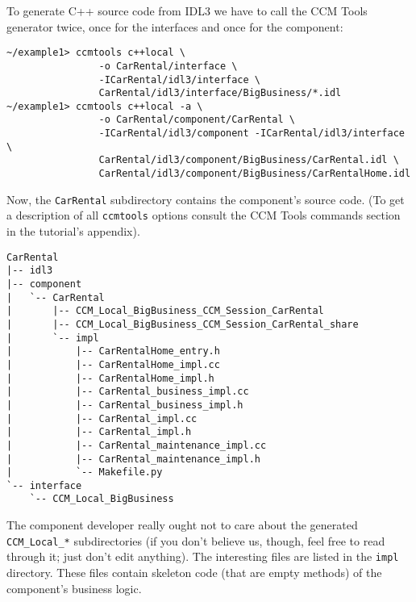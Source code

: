 \newpage
To generate C++ source code from IDL3 we have to call the CCM Tools generator
twice, once for the interfaces and once for the component:
\begin{small}
\begin{verbatim}
~/example1> ccmtools c++local \
                -o CarRental/interface \
                -ICarRental/idl3/interface \
                CarRental/idl3/interface/BigBusiness/*.idl
~/example1> ccmtools c++local -a \
                -o CarRental/component/CarRental \
                -ICarRental/idl3/component -ICarRental/idl3/interface \
                CarRental/idl3/component/BigBusiness/CarRental.idl \
                CarRental/idl3/component/BigBusiness/CarRentalHome.idl
\end{verbatim}
\end{small}

Now, the {\tt CarRental} subdirectory contains the component's source code. 
(To get a description of all {\tt ccmtools} options consult the 
CCM Tools commands section in the tutorial's appendix).
\begin{small}
\begin{verbatim}
CarRental
|-- idl3
|-- component
|   `-- CarRental
|       |-- CCM_Local_BigBusiness_CCM_Session_CarRental
|       |-- CCM_Local_BigBusiness_CCM_Session_CarRental_share
|       `-- impl
|           |-- CarRentalHome_entry.h
|           |-- CarRentalHome_impl.cc
|           |-- CarRentalHome_impl.h
|           |-- CarRental_business_impl.cc
|           |-- CarRental_business_impl.h
|           |-- CarRental_impl.cc
|           |-- CarRental_impl.h
|           |-- CarRental_maintenance_impl.cc
|           |-- CarRental_maintenance_impl.h
|           `-- Makefile.py
`-- interface
    `-- CCM_Local_BigBusiness
\end{verbatim}
\end{small}

The component developer really ought not to care about the generated 
{\tt CCM\_Local\_*} subdirectories (if you don't believe us, though, feel free 
to read through it; just don't edit anything). 
The interesting files are listed in the {\tt impl} directory. 
These files contain skeleton code (that are empty methods) of the component's 
business logic.

